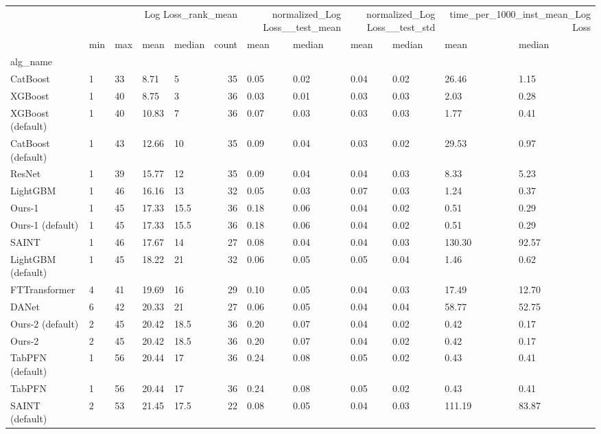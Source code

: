 \begin{tabular}{lllllrllllll}
\toprule
 & \multicolumn{5}{r}{Log Loss_rank_mean} & \multicolumn{2}{r}{normalized_Log Loss__test_mean} & \multicolumn{2}{r}{normalized_Log Loss__test_std} & \multicolumn{2}{r}{time_per_1000_inst_mean_Log Loss} \\
 & min & max & mean & median & count & mean & median & mean & median & mean & median \\
alg_name &  &  &  &  &  &  &  &  &  &  &  \\
\midrule
CatBoost & 1 & 33 & 8.71 & 5 & 35 & 0.05 & 0.02 & 0.04 & 0.02 & 26.46 & 1.15 \\
XGBoost & 1 & 40 & 8.75 & 3 & 36 & 0.03 & 0.01 & 0.03 & 0.03 & 2.03 & 0.28 \\
XGBoost (default) & 1 & 40 & 10.83 & 7 & 36 & 0.07 & 0.03 & 0.03 & 0.03 & 1.77 & 0.41 \\
CatBoost (default) & 1 & 43 & 12.66 & 10 & 35 & 0.09 & 0.04 & 0.03 & 0.02 & 29.53 & 0.97 \\
ResNet & 1 & 39 & 15.77 & 12 & 35 & 0.09 & 0.04 & 0.04 & 0.03 & 8.33 & 5.23 \\
LightGBM & 1 & 46 & 16.16 & 13 & 32 & 0.05 & 0.03 & 0.07 & 0.03 & 1.24 & 0.37 \\
Ours-1 & 1 & 45 & 17.33 & 15.5 & 36 & 0.18 & 0.06 & 0.04 & 0.02 & 0.51 & 0.29 \\
Ours-1 (default) & 1 & 45 & 17.33 & 15.5 & 36 & 0.18 & 0.06 & 0.04 & 0.02 & 0.51 & 0.29 \\
SAINT & 1 & 46 & 17.67 & 14 & 27 & 0.08 & 0.04 & 0.04 & 0.03 & 130.30 & 92.57 \\
LightGBM (default) & 1 & 45 & 18.22 & 21 & 32 & 0.06 & 0.05 & 0.05 & 0.04 & 1.46 & 0.62 \\
FTTransformer & 4 & 41 & 19.69 & 16 & 29 & 0.10 & 0.05 & 0.04 & 0.03 & 17.49 & 12.70 \\
DANet & 6 & 42 & 20.33 & 21 & 27 & 0.06 & 0.05 & 0.04 & 0.04 & 58.77 & 52.75 \\
Ours-2 (default) & 2 & 45 & 20.42 & 18.5 & 36 & 0.20 & 0.07 & 0.04 & 0.02 & 0.42 & 0.17 \\
Ours-2 & 2 & 45 & 20.42 & 18.5 & 36 & 0.20 & 0.07 & 0.04 & 0.02 & 0.42 & 0.17 \\
TabPFN (default) & 1 & 56 & 20.44 & 17 & 36 & 0.24 & 0.08 & 0.05 & 0.02 & 0.43 & 0.41 \\
TabPFN & 1 & 56 & 20.44 & 17 & 36 & 0.24 & 0.08 & 0.05 & 0.02 & 0.43 & 0.41 \\
SAINT (default) & 2 & 53 & 21.45 & 17.5 & 22 & 0.08 & 0.05 & 0.04 & 0.03 & 111.19 & 83.87 \\

\end{tabular}
